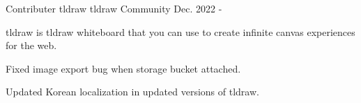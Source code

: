 \begin{cventries}
  \cventry
  {Contributer} %
  {tldraw} %
  {tldraw Community} %
  {Dec. 2022 - } %
  {
    \begin{cvitems} %
      \item {tldraw is tldraw whiteboard that you can use to create infinite canvas experiences for the web.}
      \item {Fixed image export bug when storage bucket attached.}      
      \item {Updated Korean localization in updated versions of tldraw.}
    \end{cvitems}
  }

\end{cventries}
